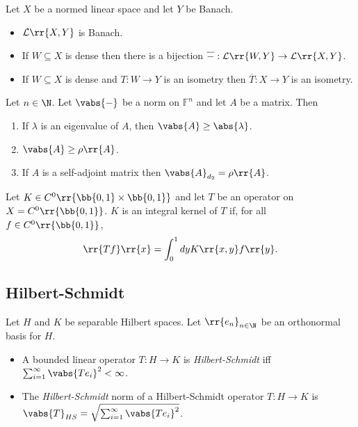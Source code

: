 \documentclass{article}
\begin{document}
\begin{theorem}
  Let $X$ be a normed linear space and let $Y$ be Banach.
  \begin{itemize}
    \item $\mathcal L\rr{X,Y}$ is Banach.
    \item If $W\subseteq X$ is dense then there is a bijection
      $\overline{-}:\mathcal L\rr{W,Y}\to\mathcal L\rr{X,Y}$.
    \item If $W\subseteq X$ is dense and $T:W\to Y$ is an isometry
      then $\overline T:X\to Y$ is an isometry.
  \end{itemize}
\end{theorem}

\begin{theorem}
  Let $n\in\N$. Let $\vabs{-}$ be a norm on $\mathbb F^n$ and let $A$ be a matrix. Then
  \begin{enumerate}
    \item If $\lambda$ is an eigenvalue of $A$, then $\vabs{A}\geq \abs{\lambda}$.
    \item $\vabs{A}\geq \rho\rr{A}$.
    \item If $A$ is a self-adjoint matrix then $\vabs{A}_{d_2}=\rho\rr{A}$.
  \end{enumerate}
\end{theorem}

\begin{definition}
  Let $K\in C^0\rr{\bb{0,1}\times \bb{0,1}}$ and let $T$ be an operator on $X=C^0\rr{\bb{0,1}}$.
  $K$ is an integral kernel of $T$ if, for all $f\in C^0\rr{\bb{0,1}}$,
  \begin{align*}
    \rr{Tf}\rr{x}=\int_0^1 dy K\rr{x,y}f\rr{y}.
  \end{align*}
\end{definition}

\subsection{Hilbert-Schmidt}

\begin{definition}
  Let $H$ and $K$ be separable Hilbert spaces. Let $\rr{e_n}_{n\in\N}$ be an orthonormal
  basis for $H$.
  \begin{itemize}
    \item A bounded linear operator $T:H\to K$ is \emph{Hilbert-Schmidt} iff
      $\sum_{i=1}^{\infty} \vabs{Te_i}^2<\infty$.
    \item The \emph{Hilbert-Schmidt} norm of a Hilbert-Schmidt operator $T:H\to
      K$ is $\vabs{T}_{HS}=\sqrt{\sum_{i=1}^{\infty} \vabs{Te_i}^2}$.
  \end{itemize}
\end{definition}
\end{document}
